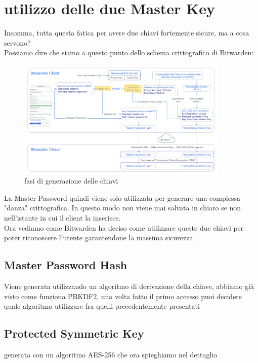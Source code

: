 \documentclass[a4paper,12pt]{report}
\begin{document}
			\section{utilizzo delle due Master Key}
			Insomma, tutta questa fatica per avere due chiavi fortemente sicure,
			ma a cosa servono?\\
			Possiamo dire che siamo a questo punto dello schema crittografico di Bitwarden:
			\begin{figure}[H]
				\centering
				\includegraphics[width=0.9\textwidth]{masterKeyGenerated.png}
				\caption{fasi di generazione delle chiavi}
				\label{fig:masterKey}
			\end{figure}
			La Master Password quindi viene solo utilizzata per generare una complessa
			"danza" crittografica. In questo modo non viene mai salvata in chiaro 
			se non nell'istante in cui il client la inserisce.\\
			Ora vediamo come Bitwarden ha deciso come utilizzare queste due chiavi
			per poter riconoscere l'utente garantendone la massima sicurezza.
			\subsection{Master Password Hash}
			 Viene generata utilizzando un algoritmo di derivazione della chiave, 
			 abbiamo già visto come funziona PBKDF2, una volta fatto il primo accesso
			 puoi decidere quale algoritmo utilizzare fra quelli precedentemente presentati
			\subsection{Protected Symmetric Key}
				generata con un algoritmo AES-256 che ora spieghiamo nel dettaglio 
\end{document}
